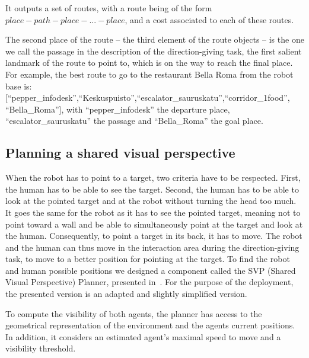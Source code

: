 \documentclass[a4paper,11pt,twoside]{StyleThese}
\begin{document}
It outputs a set of routes, with a route being of the form $place - path - place - ... - place$, and a cost associated to each of these routes. 

The second place of the route -- the third element of the route objects -- is the one we call the passage in the description of the direction-giving task, the first salient landmark of the route to point to, which is on the way to reach the final place. For example, the best route to go to the restaurant Bella Roma from the robot base is: [``pepper\_infodesk'',``Keskuspuisto'',``escalator\_sauruskatu'',``corridor\_1food'',\\``Bella\_Roma''], with ``pepper\_infodesk'' the departure place, ``escalator\_sauruskatu'' the passage and ``Bella\_Roma'' the goal place.


\subsection{Planning a shared visual perspective}\label{subsec:svp}

When the robot has to point to a target, two criteria have to be respected. First, the human has to be able to see the target. Second, the human has to be able to look at the pointed target and at the robot without turning the head too much. It goes the same for the robot as it has to see the pointed target, meaning not to point toward a wall and be able to simultaneously point at the target and look at the human. Consequently, to point a target in its back, it has to move. The robot and the human can thus move in the interaction area during the direction-giving task, to move to a better position for pointing at the target. To find the robot and human possible positions we designed a component called the SVP (Shared Visual Perspective) Planner, presented in~\citep{waldhart_2019_reasoning}. For the purpose of the deployment, the presented version is an adapted and slightly simplified version.

To compute the visibility of both agents, the planner has access to the geometrical representation of the environment and the agents current positions. In addition, it considers an estimated agent's maximal speed to move and a visibility threshold.
\end{document}

